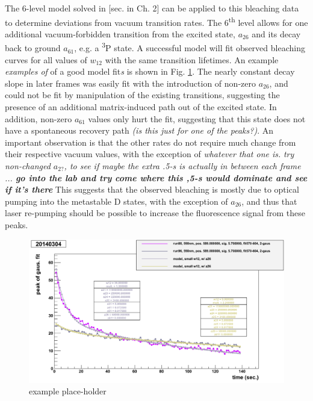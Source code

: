 The 6-level model solved in [sec. in Ch. 2] can be applied to this bleaching data to determine deviations from vacuum transition rates.  The 6\textsuperscript{th} level allows for one additional vacuum-forbidden transition from the excited state, $a_{26}$ and its decay back to ground $a_{61}$, e.g. a \textsuperscript{3}P state.  A successful model will fit observed bleaching curves for all values of $w_{12}$ with the same transition lifetimes.  An example \emph{\color{gray}examples of} of a good model fit\emph{\color{gray}s} is shown in Fig. \ref{fig:bleachModel}.   The nearly constant decay slope in later frames was easily fit with the introduction of non-zero $a_{26}$, and could not be fit by manipulation of the existing transitions, suggesting the presence of an additional matrix-induced path out of the excited state. In addition, non-zero $a_{61}$ values only hurt the fit, suggesting that this state does not have a spontaneous recovery path  \emph{\color{gray}(is this just for one of the peaks?)}.  An important observation is that the other rates do not require much change from their respective vacuum values, with the exception of \emph{\color{gray}whatever that one is.}  \emph{try non-changed $a_{2?}$, to see if maybe the extra .5-s is actually in between each frame ... \textbf{go into the lab and try come where this ,5-s would dominate and see if it's there}}  This suggests that the observed bleaching is mostly due to optical pumping into the metastable D states, with the exception of $a_{26}$, and thus that laser re-pumping should be possible to increase the fluorescence signal from these peaks.

\begin{figure} %
        \centering
                \includegraphics[width=.7\textwidth]{figures/model_smallw12_a26_run96and88_close.png}
                \caption{\color{red}example place-holder}
\label{fig:bleachModel}
\end{figure}

